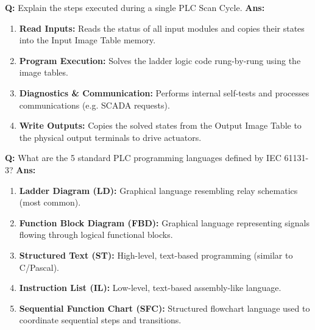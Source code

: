 \documentclass[10pt,a4paper,twocolumn]{article}
\begin{document}
\begin{tcolorbox}[
  colback=white,
  colframe=UnitColorThree,
  colbacktitle=gray!10!white,
  coltitle=black,
  fonttitle=\bfseries\sffamily\small,
  title={Unit III $\bullet$ Card 3: PLC Scan Cycle},
  boxrule=1.2pt,
  arc=2mm,
  outer arc=2mm,
  boxsep=1.5mm,
  top=1mm,
  bottom=1mm,
  left=1.5mm,
  right=1.5mm,
  before skip=2.5mm,
  after skip=2.5mm
]
\textbf{Q:} Explain the steps executed during a single PLC Scan Cycle.
\tcbline
\textbf{Ans:} \begin{enumerate}
  \item \textbf{Read Inputs:} Reads the status of all input modules and copies their states into the Input Image Table memory.
  \item \textbf{Program Execution:} Solves the ladder logic code rung-by-rung using the image tables.
  \item \textbf{Diagnostics \& Communication:} Performs internal self-tests and processes communications (e.g. SCADA requests).
  \item \textbf{Write Outputs:} Copies the solved states from the Output Image Table to the physical output terminals to drive actuators.
\end{enumerate}
\end{tcolorbox}


\begin{tcolorbox}[
  colback=white,
  colframe=UnitColorThree,
  colbacktitle=gray!10!white,
  coltitle=black,
  fonttitle=\bfseries\sffamily\small,
  title={Unit III $\bullet$ Card 4: IEC 61131-3 PLC Languages},
  boxrule=1.2pt,
  arc=2mm,
  outer arc=2mm,
  boxsep=1.5mm,
  top=1mm,
  bottom=1mm,
  left=1.5mm,
  right=1.5mm,
  before skip=2.5mm,
  after skip=2.5mm
]
\textbf{Q:} What are the 5 standard PLC programming languages defined by IEC 61131-3?
\tcbline
\textbf{Ans:} \begin{enumerate}
  \item \textbf{Ladder Diagram (LD):} Graphical language resembling relay schematics (most common).
  \item \textbf{Function Block Diagram (FBD):} Graphical language representing signals flowing through logical functional blocks.
  \item \textbf{Structured Text (ST):} High-level, text-based programming (similar to C/Pascal).
  \item \textbf{Instruction List (IL):} Low-level, text-based assembly-like language.
  \item \textbf{Sequential Function Chart (SFC):} Structured flowchart language used to coordinate sequential steps and transitions.
\end{enumerate}
\end{tcolorbox}
\end{document}
